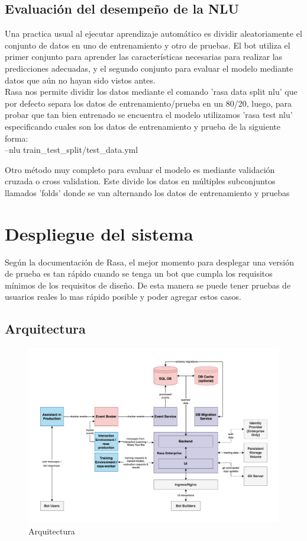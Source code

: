 \subsection{Evaluación del desempeño de la NLU}
Una practica usual al ejecutar aprendizaje automático es dividir aleatoriamente el conjunto de datos en uno de entrenamiento y otro de pruebas. El bot utiliza el primer conjunto para aprender las características necesarias para realizar las predicciones adecuadas, y el segundo conjunto para evaluar el modelo mediante datos que aún no hayan sido vistos antes.\\
Rasa nos permite dividir los datos mediante el comando 'rasa data split nlu' que por defecto separa los datos de entrenamiento/prueba en un 80/20, luego, para probar que tan bien entrenado se encuentra el modelo utilizamos 'rasa test nlu' especificando cuales son los datos de entrenamiento y prueba de la siguiente forma:\\
    --nlu train\_test\_split/test\_data.yml

Otro método muy completo para evaluar el modelo es mediante validación cruzada o cross validation. Este divide los datos en múltiples subconjuntos llamados 'folds' donde se van alternando los datos de entrenamiento y pruebas

\section{Despliegue del sistema}
Según la documentación de Rasa, el mejor momento para desplegar una versión de prueba es tan rápido cuando 
se tenga un bot que cumpla los requisitos mínimos de los requisitos de diseño. De esta manera se puede
tener pruebas de usuarios reales lo mas rápido posible y poder agregar estos casos.

\subsection{Arquitectura}

\begin{figure}[h]
    \centering
    \includegraphics[width=\textwidth]{imagenes/cap3/architecture_deploy.png}   
    \caption{Arquitectura}
    \label{fig:deploy-architecture}
\end{figure}

